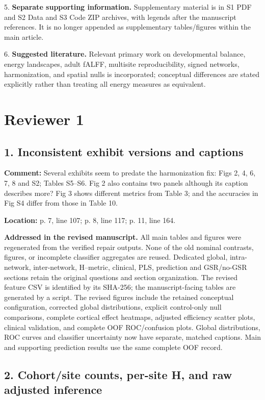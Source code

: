 \documentclass[11pt]{article}
\begin{document}
5. \textbf{Separate supporting information.} Supplementary material is in S1 PDF and    S2 Data and S3 Code ZIP archives, with legends after the manuscript references. It is    no longer appended as supplementary tables/figures within the main article.


6. \textbf{Suggested literature.} Relevant primary work on developmental balance,    energy landscapes, adult fALFF, multisite reproducibility, signed networks,    harmonization, and spatial nulls is incorporated; conceptual differences are    stated explicitly rather than treating all energy measures as equivalent.


\section*{Reviewer 1}

\subsection*{1. Inconsistent exhibit versions and captions}

\textbf{Comment:} Several exhibits seem to predate the harmonization fix: Figs 2, 4, 6, 7, 8 and S2; Tables S5--S6. Fig 2 also contains two panels although its caption describes more? Fig 3 shows different metrics from Table 3; and the accuracies in Fig S4 differ from those in Table 10.


\textbf{Location:} p. 7, line 107; p. 8, line 117; p. 11, line 164.


 \textbf{Addressed in the revised manuscript.} All main tables and figures were regenerated from the verified repair outputs. None of the old nominal contrasts, figures, or incomplete classifier aggregates are reused. Dedicated global, intra-network, inter-network, H--metric, clinical, PLS, prediction and GSR/no-GSR sections retain the original questions and section organization. The revised feature CSV is identified by its SHA-256; the manuscript-facing tables are generated by a script. The revised figures include the retained conceptual configuration, corrected global distributions, explicit control-only null comparisons, complete cortical effect heatmaps, adjusted efficiency scatter plots, clinical validation, and complete OOF ROC/confusion plots. Global distributions, ROC curves and classifier uncertainty now have separate, matched captions. Main and supporting prediction results use the same complete OOF record.


\subsection*{2. Cohort/site counts, per-site H, and raw adjusted inference}
\end{document}
